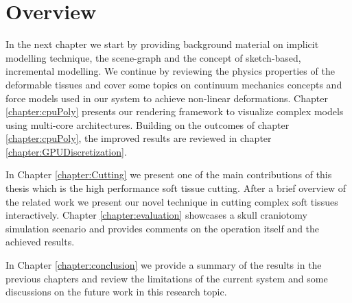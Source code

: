\section{Overview}
In the next chapter we start by providing background material on implicit modelling technique, the 
\blob scene-graph and the concept of sketch-based, incremental modelling.
We continue by reviewing the physics properties of the deformable tissues and cover some topics on 
continuum mechanics concepts and force models used in our system to achieve non-linear deformations. 
Chapter \ref{chapter:cpuPoly} presents our rendering framework to visualize complex \blob models using 
multi-core architectures. Building on the outcomes of chapter \ref{chapter:cpuPoly}, the improved results 
are reviewed in chapter \ref{chapter:GPUDiscretization}. 

In Chapter \ref{chapter:Cutting} we present one of the main contributions of this thesis which is the high 
performance soft tissue cutting. After a brief overview of the related work we present our novel technique 
in cutting complex soft tissues interactively. Chapter \ref{chapter:evaluation} showcases a skull craniotomy 
simulation scenario and provides comments on the operation itself and the achieved results.

In Chapter \ref{chapter:conclusion} we provide a summary of the results in the previous chapters and 
review the limitations of the current system and some discussions on the future work in this research topic.















